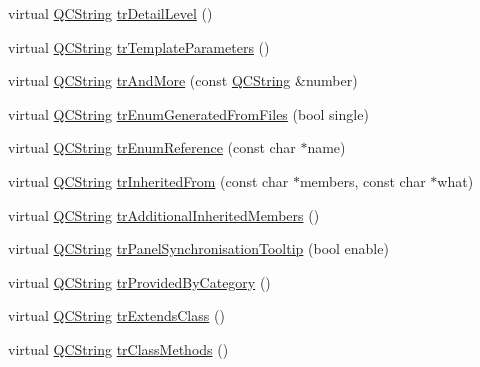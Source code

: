 \begin{DoxyCompactItemize}
\item 
virtual \mbox{\hyperlink{class_q_c_string}{Q\+C\+String}} \mbox{\hyperlink{class_translator_chinesetraditional_a00053c8f20188be89234c72eda9be0b9}{tr\+Detail\+Level}} ()
\item 
virtual \mbox{\hyperlink{class_q_c_string}{Q\+C\+String}} \mbox{\hyperlink{class_translator_chinesetraditional_a2905cc66e8c20210948c8f8511241950}{tr\+Template\+Parameters}} ()
\item 
virtual \mbox{\hyperlink{class_q_c_string}{Q\+C\+String}} \mbox{\hyperlink{class_translator_chinesetraditional_a6f3733294331a8692ba66be8f52653d7}{tr\+And\+More}} (const \mbox{\hyperlink{class_q_c_string}{Q\+C\+String}} \&number)
\item 
virtual \mbox{\hyperlink{class_q_c_string}{Q\+C\+String}} \mbox{\hyperlink{class_translator_chinesetraditional_ad618207c34ac0cdd9b6ef4e06760be70}{tr\+Enum\+Generated\+From\+Files}} (bool single)
\item 
virtual \mbox{\hyperlink{class_q_c_string}{Q\+C\+String}} \mbox{\hyperlink{class_translator_chinesetraditional_a89cf15997aee469596da4fb791eabbe9}{tr\+Enum\+Reference}} (const char $\ast$name)
\item 
virtual \mbox{\hyperlink{class_q_c_string}{Q\+C\+String}} \mbox{\hyperlink{class_translator_chinesetraditional_ac1bf1062680895db546f1695adec0d0c}{tr\+Inherited\+From}} (const char $\ast$members, const char $\ast$what)
\item 
virtual \mbox{\hyperlink{class_q_c_string}{Q\+C\+String}} \mbox{\hyperlink{class_translator_chinesetraditional_a84f0a69aa5ba86bf01b893606a7fe9a4}{tr\+Additional\+Inherited\+Members}} ()
\item 
virtual \mbox{\hyperlink{class_q_c_string}{Q\+C\+String}} \mbox{\hyperlink{class_translator_chinesetraditional_ad842d937ba05293dcd9f47b0bff544f4}{tr\+Panel\+Synchronisation\+Tooltip}} (bool enable)
\item 
virtual \mbox{\hyperlink{class_q_c_string}{Q\+C\+String}} \mbox{\hyperlink{class_translator_chinesetraditional_aa75037ae6678f4a7ed4602e3cdff7972}{tr\+Provided\+By\+Category}} ()
\item 
virtual \mbox{\hyperlink{class_q_c_string}{Q\+C\+String}} \mbox{\hyperlink{class_translator_chinesetraditional_a3b5605dd807ddb103e8cdeb8af243185}{tr\+Extends\+Class}} ()
\item 
virtual \mbox{\hyperlink{class_q_c_string}{Q\+C\+String}} \mbox{\hyperlink{class_translator_chinesetraditional_a361fda1ff6b981ffed6d10a2b4c7fccc}{tr\+Class\+Methods}} ()
\item 

\end{DoxyCompactItemize}
